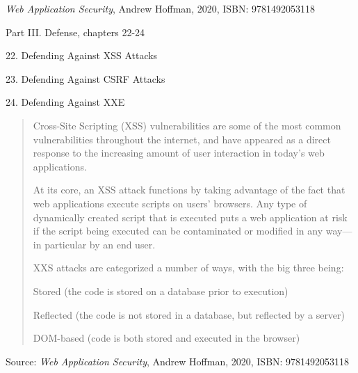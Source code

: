 \documentclass[Screen16to9,17pt]{foils}
\begin{document}

\emph{Web Application Security}, Andrew Hoffman, 2020, ISBN: 9781492053118

\begin{list1}
\item Part III. Defense, chapters 22-24
\item 22. Defending Against XSS Attacks
\item 23. Defending Against CSRF Attacks
\item 24. Defending Against XXE
\end{list1}





\begin{quote}
Cross-Site Scripting (XSS) vulnerabilities are some of the most common vulnerabilities throughout the internet, and have appeared as a direct response to the increasing amount of user interaction in today’s web applications.

At its core, an XSS attack functions by taking advantage of the fact that web applications execute scripts on users’ browsers. Any type of dynamically created script that is executed puts a web application at risk if the script being executed can be contaminated or modified in any way—in particular by an end user.

XXS attacks are categorized a number of ways, with the big three being:
\begin{list2}
\item Stored (the code is stored on a database prior to execution)
\item Reflected (the code is not stored in a database, but reflected by a server)
\item DOM-based (code is both stored and executed in the browser)
\end{list2}
\end{quote}

Source: \emph{Web Application Security}, Andrew Hoffman, 2020, ISBN: 9781492053118



\end{document}

